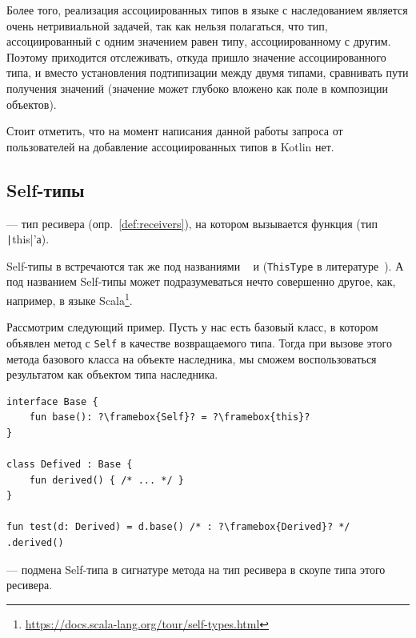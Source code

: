 Более того, реализация ассоциированных типов в языке с наследованием является очень нетривиальной задачей, так как нельзя полагаться, что тип, ассоциированный с одним значением равен типу, ассоциированному с другим.
Поэтому приходится отслеживать, откуда пришло значение ассоциированного типа, и вместо установления подтипизации между двумя типами, сравнивать пути получения значений (значение может глубоко вложено как поле в композиции объектов).

Стоит отметить, что на момент написания данной работы запроса от пользователей на добавление ассоциированных типов в Kotlin нет.


\subsection{Self-типы} \label{subsec:self-types}

\begin{definition}
    \label{def:self-type}
     --- тип ресивера (опр.~\ref{def:receivers}), на котором вызывается функция (тип \texttt|this|'а).
\end{definition}

Self-типы в встречаются так же под названиями ~\cite{amadio1993subtyping} и  (\texttt{ThisType} в литературе~\cite{ryu2016thistype}).
А под названием Self-типы может подразумеваться нечто совершенно другое, как, например, в языке Scala\footnote{\url{https://docs.scala-lang.org/tour/self-types.html}}.

Рассмотрим следующий пример.
Пусть у нас есть базовый класс, в котором объявлен метод с \texttt{Self} в качестве возвращаемого типа.
Тогда при вызове этого метода базового класса на объекте наследника, мы сможем воспользоваться результатом как объектом типа наследника.

\begin{verbatim}
interface Base {
    fun base(): ?\framebox{Self}? = ?\framebox{this}?
}

class Defived : Base {
    fun derived() { /* ... */ }
}

fun test(d: Derived) = d.base() /* : ?\framebox{Derived}? */ .derived()
\end{verbatim}

\begin{definition}
    \label{def:materialization}
     --- подмена Self-типа в сигнатуре метода на тип ресивера в скоупе типа этого ресивера.
\end{definition}

